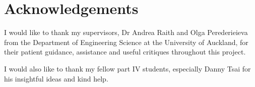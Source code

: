 \chapter*{Acknowledgements}
I would like to thank my supervisors, Dr Andrea Raith and Olga Perederieieva from the Department of Engineering Science at the University of Auckland,
for their patient guidance, assistance and useful critiques throughout this project.

I would also like to thank my fellow part IV students, especially Danny Tsai for his insightful ideas and kind help.
